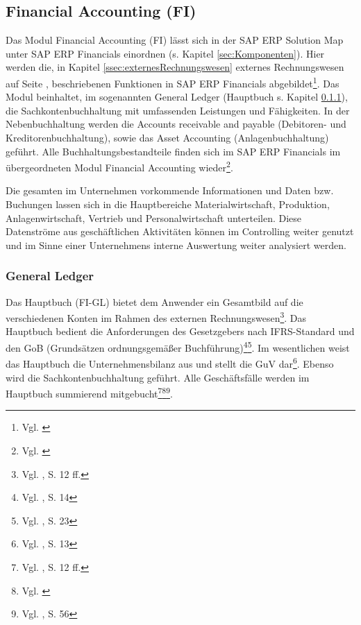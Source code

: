 \subsection{Financial Accounting (FI)} %
Das Modul Financial Accounting (FI) lässt sich in der SAP ERP Solution Map unter SAP ERP Financials einordnen (s. Kapitel \ref{sec:Komponenten}). 
Hier werden die, in Kapitel \ref{ssec:externesRechnungswesen} externes Rechnungswesen auf Seite \pageref{ssec:externesRechnungswesen}, beschriebenen Funktionen in SAP ERP Financials abgebildet\footnote{Vgl. \cite{SAPBusinessMaps2010}}. Das Modul beinhaltet, im sogenannten General Ledger (Hauptbuch s. Kapitel \ref{sec:gl}), die Sachkontenbuchhaltung mit umfassenden Leistungen und Fähigkeiten. In der Nebenbuchhaltung werden die Accounts receivable and payable (Debitoren- und Kreditorenbuchhaltung), sowie das Asset Accounting (Anlagenbuchhaltung) geführt. 
Alle Buchhaltungsbestandteile finden sich im SAP ERP Financials im übergeordneten Modul Financial Accounting wieder\footnote{Vgl. \cite{SAPBusinessMaps2010}}. 

Die gesamten im Unternehmen vorkommende Informationen und Daten bzw. Buchungen lassen sich in die Hauptbereiche Materialwirtschaft, Produktion, Anlagenwirtschaft, Vertrieb und Personalwirtschaft unterteilen. Diese Datenströme aus geschäftlichen Aktivitäten können im Controlling weiter genutzt und im Sinne einer Unternehmens interne Auswertung weiter analysiert werden.

\subsubsection{General Ledger} \label{sec:gl}%
Das Hauptbuch (FI-GL) bietet dem Anwender ein Gesamtbild auf die verschiedenen Konten im Rahmen des externen Rechnungswesen\footnote{Vgl. \cite{SAPGL2001}, S. 12 ff.}. Das Hauptbuch bedient die Anforderungen des Gesetzgebers nach IFRS-Standard und den GoB (Grundsätzen ordnungsgemäßer Buchführung)\footnote{Vgl. \cite{SAPGL2001}, S. 14}\footnote{Vgl. \cite{SAPGL2001}, S. 23}. Im wesentlichen weist das Hauptbuch die Unternehmensbilanz aus und stellt die GuV dar\footnote{Vgl. \cite{SAPGL2001}, S. 13}. Ebenso wird die Sachkontenbuchhaltung geführt. Alle Geschäftsfälle werden im Hauptbuch summierend mitgebucht\footnote{Vgl. \cite{SAPGL2001}, S. 12 ff.}\footnote{Vgl. \cite{FICOForum2012}}\footnote{Vgl. \cite{SAPGL2001}, S. 56}. 

